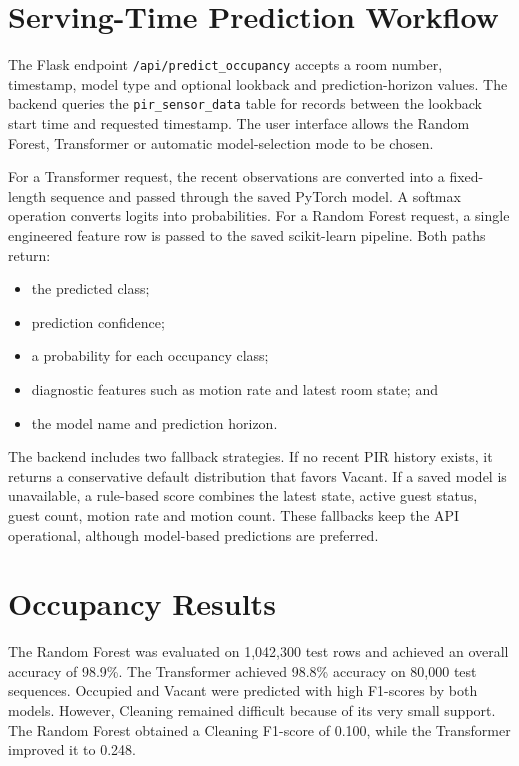 \section{Serving-Time Prediction Workflow}

The Flask endpoint \texttt{/api/predict\_occupancy} accepts a room number,
timestamp, model type and optional lookback and prediction-horizon values. The
backend queries the \texttt{pir\_sensor\_data} table for records between the
lookback start time and requested timestamp. The user interface allows the
Random Forest, Transformer or automatic model-selection mode to be chosen.

For a Transformer request, the recent observations are converted into a
fixed-length sequence and passed through the saved PyTorch model. A softmax
operation converts logits into probabilities. For a Random Forest request, a
single engineered feature row is passed to the saved scikit-learn pipeline.
Both paths return:

\begin{itemize}
    \item the predicted class;
    \item prediction confidence;
    \item a probability for each occupancy class;
    \item diagnostic features such as motion rate and latest room state; and
    \item the model name and prediction horizon.
\end{itemize}

The backend includes two fallback strategies. If no recent PIR history exists,
it returns a conservative default distribution that favors Vacant. If a saved
model is unavailable, a rule-based score combines the latest state, active
guest status, guest count, motion rate and motion count. These fallbacks keep
the API operational, although model-based predictions are preferred.

\section{Occupancy Results}

The Random Forest was evaluated on 1,042,300 test rows and achieved an overall
accuracy of 98.9\%. The Transformer achieved 98.8\% accuracy on 80,000 test
sequences. Occupied and Vacant were predicted with high F1-scores by both
models. However, Cleaning remained difficult because of its very small support.
The Random Forest obtained a Cleaning F1-score of 0.100, while the Transformer
improved it to 0.248.

